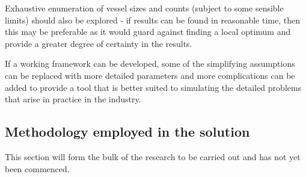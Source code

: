Exhaustive enumeration of vessel sizes and counts (subject to some sensible
limits) should also be explored - if results can be found in reasonable time,
then this may be preferable as it would guard against finding a local optimum
and provide a greater degree of certainty in the results.

If a working framework can be developed, some of the simplifying assumptions can
be replaced with more detailed parameters and more complications can be added
to provide a tool that is better suited to simulating the detailed problems that
arise in practice in the industry.

\subsection{Methodology employed in the solution}\label{SS.method1}
This section will form the bulk of the research to be carried out and has not 
yet been commenced.
